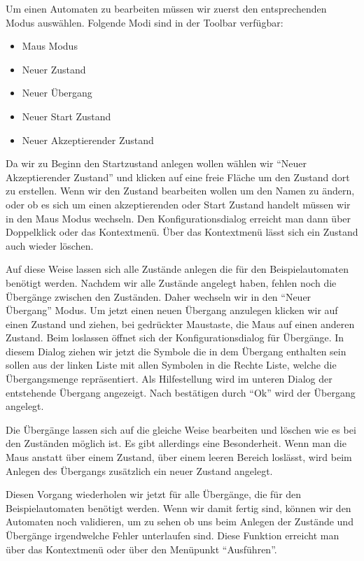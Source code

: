 Um einen Automaten zu bearbeiten müssen wir zuerst den entsprechenden Modus
auswählen. Folgende Modi sind in der Toolbar verfügbar:

\begin{itemize}
  \item Maus Modus
  \item Neuer Zustand
  \item Neuer Übergang
  \item Neuer Start Zustand
  \item Neuer Akzeptierender Zustand
\end{itemize}

Da wir zu Beginn den Startzustand anlegen wollen wählen wir "`Neuer Akzeptierender
Zustand"' und klicken auf eine freie Fläche um den Zustand dort zu erstellen.
Wenn wir den Zustand bearbeiten wollen um den Namen zu ändern, oder ob es sich
um einen akzeptierenden oder Start Zustand handelt müssen wir in den Maus Modus
wechseln. Den Konfigurationsdialog erreicht man dann über Doppelklick oder das
Kontextmenü. Über das Kontextmenü lässt sich ein Zustand auch wieder
löschen.\vspace{10pt}

Auf diese Weise lassen sich alle Zustände anlegen die für den Beispielautomaten
benötigt werden. Nachdem wir alle Zustände angelegt haben, fehlen noch die
Übergänge zwischen den Zuständen. Daher wechseln wir in den "`Neuer Übergang"'
Modus. Um jetzt einen neuen Übergang anzulegen klicken wir auf einen Zustand 
und ziehen, bei gedrückter Maustaste, die Maus auf einen anderen Zustand. Beim
loslassen öffnet sich der Konfigurationsdialog für Übergänge. In diesem Dialog 
ziehen wir jetzt die Symbole die in dem Übergang enthalten sein sollen aus der 
linken Liste mit allen Symbolen in die Rechte Liste, welche die Übergangsmenge
repräsentiert. Als Hilfestellung wird im unteren Dia\-log der entstehende
Übergang angezeigt. Nach bestätigen durch "`Ok"' wird der Übergang angelegt.\vspace{10pt}

Die Übergänge lassen sich auf die gleiche Weise bearbeiten und löschen wie
es bei den Zuständen möglich ist. Es gibt allerdings eine Besonderheit. Wenn
man die Maus anstatt über einem Zustand, über einem leeren Bereich
loslässt, wird beim Anlegen des Übergangs zusätzlich ein neuer Zustand
angelegt.\vspace{10pt}

Diesen Vorgang wiederholen wir jetzt für alle Übergänge, die
für den Beispielautomaten benötigt werden. Wenn wir damit fertig sind, können
wir den Automaten noch validieren, um zu sehen ob uns beim Anlegen der Zustände
und Übergänge irgendwelche Fehler unterlaufen sind. Diese Funktion erreicht man
über das Kontextmenü oder über den Menüpunkt "`Ausführen"'.

